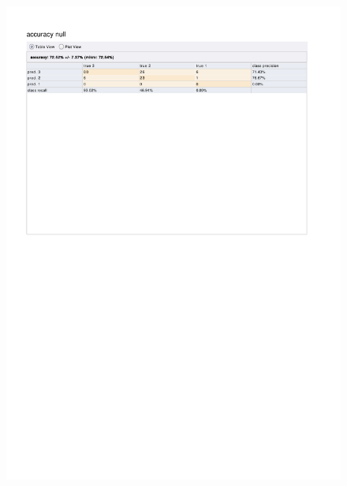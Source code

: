 \begin{figure}[htp]
  \centerline{\includegraphics[trim=0 680 0 80,clip,width=16.09cm]{results/ANN_A_Distraction.pdf}} \caption{
} \label{ANN_A_Distraction}
\end{figure}

